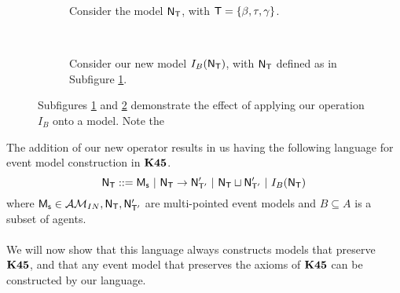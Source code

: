 \begin{figure}[ht!]
\centering
\begin{subfigure}[b]{.45\textwidth}
\centering
{}
\caption{Consider the model $\mathrm{\mathsf{N}}_\mathrm{\mathsf{T}}$, with $\mathrm{\mathsf{T}} = \{\beta, \tau, \gamma\}$.}
\label{beforeOperation}
\end{subfigure}
~
\begin{subfigure}[b]{.45\textwidth}
\centering
{}
\caption{Consider our new model $I_B(\mathrm{\mathsf{N}}_\mathrm{\mathsf{T}})$, with $\mathrm{\mathsf{N}}_\mathrm{\mathsf{T}}$ defined as in Subfigure
\ref{beforeOperation}.}
\label{afterOperation}
\end{subfigure}
\caption{Subfigures \ref{beforeOperation} and \ref{afterOperation} demonstrate the effect of
applying our operation $I_B$ onto a model.
Note the }
\label{k45VsKModels}
\end{figure}

The addition of our new operator results in us having the following language for
event model construction in $\bf K45$.
\[
	\mathrm{\mathsf{N}}_\mathrm{\mathsf{T}} ::= \mathrm{\mathsf{M_s}} \text{ } | \text{ }\mathrm{\mathsf{N}}_\mathrm{\mathsf{T}} \to \mathrm{\mathsf{N}}'_{\mathrm{\mathsf{T}}'} \text{ }|
  \text{ } \mathrm{\mathsf{N}}_\mathrm{\mathsf{T}} \sqcup \mathrm{\mathsf{N}}'_{\mathrm{\mathsf{T}}'} \text{ } | \text{ } I_B(\mathrm{\mathsf{N}}_\mathrm{\mathsf{T}})
\]
where $\mathrm{\mathsf{M_s}} \in \mathcal{AM}_{IN}, \mathrm{\mathsf{N}}_\mathrm{\mathsf{T}}, \mathrm{\mathsf{N}}'_{\mathrm{\mathsf{T}}'}$ are multi-pointed event models and $B \subseteq
A$ is a subset of agents.\\
\\
We will now show that this language always constructs models that preserve $\bf K45$, and that any
event model that preserves the axioms of $\bf K45$ can be constructed by our language.

